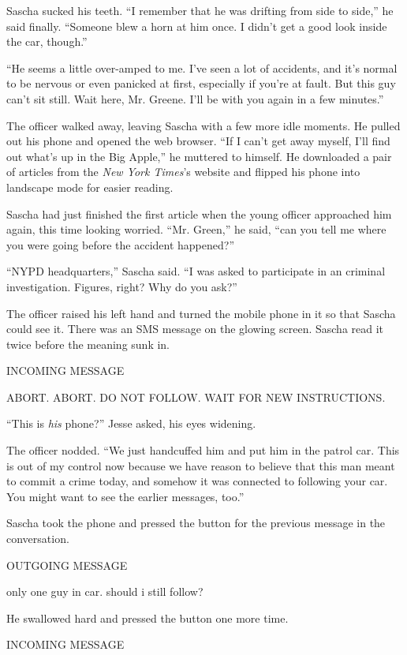 \documentclass[12pt]{book}
\begin{document}
Sascha sucked his teeth.  ``I remember that he was drifting from side to side,'' he said finally.  ``Someone blew a horn at him once.  I didn't get a good look inside the car, though.''

``He seems a little over-amped to me.  I've seen a lot of accidents, and it's normal to be nervous or even panicked at first, especially if you're at fault.  But this guy can't sit still.  Wait here, Mr. Greene.  I'll be with you again in a few minutes.''

The officer walked away, leaving Sascha with a few more idle moments.  He pulled out his phone and opened the web browser.  ``If I can't get away myself, I'll find out what's up in the Big Apple,'' he muttered to himself.  He downloaded a pair of articles from the \emph{New York Times}'s website and flipped his phone into landscape mode for easier reading.

Sascha had just finished the first article when the young officer approached him again, this time looking worried.  ``Mr. Green,'' he said, ``can you tell me where you were going before the accident happened?''

``NYPD headquarters,'' Sascha said.  ``I was asked to participate in an criminal investigation.  Figures, right?  Why do you ask?''

The officer raised his left hand and turned the mobile phone in it so that Sascha could see it.  There was an SMS message on the glowing screen.  Sascha read it twice before the meaning sunk in.

\indent INCOMING MESSAGE
	
\indent ABORT. ABORT. DO NOT FOLLOW. WAIT FOR NEW INSTRUCTIONS.
	
``This is \emph{his} phone?'' Jesse asked, his eyes widening.

The officer nodded.  ``We just handcuffed him and put him in the patrol car.  This is out of my control now because we have reason to believe that this man meant to commit a crime today, and somehow it was connected to following your car.  You might want to see the earlier messages, too.''

Sascha took the phone and pressed the button for the previous message in the conversation.


\indent OUTGOING MESSAGE
	
\indent only one guy in car. should i still follow?
	
	
He swallowed hard and pressed the button one more time.


\indent INCOMING MESSAGE
	
\end{document}
